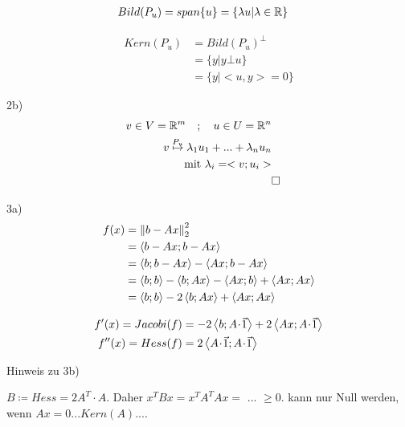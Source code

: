 \begin{equation}\begin{split}
	Bild(P_u) &= span\{u\} = \{\lambda u| \lambda \in {\mathbb R}\}
\end{split}\end{equation}

\begin{equation}\begin{split}
	Kern(P_u) &= Bild(P_u)^{\bot}\\
	&= \{y | y \bot u\}\\
	&= \{y | <u,y> = 0\}
\end{split}\end{equation}

2b)
\begin{equation}\begin{split}
	v \in V = \R^m \quad ; \quad u \in U = \R^n\\
	v \stackrel{P_u}{\mapsto} \lambda_1u_1 + ... + \lambda_nu_n \\ %
	\text{mit } \lambda_i = <v; u_i>\\
	&\square
\end{split}\end{equation}

3a)
\begin{equation}\begin{split}
	f(x) &= \left\lVert b-Ax\right\rVert_2^2 \\
	&= \left\langle b-Ax;b-Ax\right\rangle  \\
	&= \left\langle b;b-Ax\right\rangle - \left\langle Ax;b-Ax\right\rangle \\
	&= \left\langle b;b\right\rangle - \left\langle b;Ax\right\rangle -\left\langle Ax;b\right\rangle + \left\langle Ax;Ax\right\rangle \\
	&= \left\langle b;b\right\rangle -2\left\langle b;Ax\right\rangle + \left\langle Ax;Ax\right\rangle \\
\end{split}\end{equation}

\begin{equation}\begin{split}
	f'(x) = Jacobi(f) &= -2\scalprod{b}{A \scdot \vec{1}}  + 2\scalprod{Ax}{A\scdot \vec{1}}\\
	f''(x) = Hess(f) &= 2\scalprod{A \scdot \vec{1}}{A \scdot \vec{1}}\\
\end{split}\end{equation}


Hinweis zu 3b)

$B \coloneqq Hess = 2A^T\cdot A $. Daher $x^TBx = x^TA^TAx = $ ... $\geq 0$. 
kann nur Null werden, wenn $Ax = 0 ... Kern(A) ...$.

